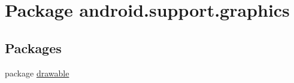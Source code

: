 \hypertarget{namespaceandroid_1_1support_1_1graphics}{}\section{Package android.\+support.\+graphics}
\label{namespaceandroid_1_1support_1_1graphics}
\subsection*{Packages}
\begin{DoxyCompactItemize}
\item 
package \mbox{\hyperlink{namespaceandroid_1_1support_1_1graphics_1_1drawable}{drawable}}
\end{DoxyCompactItemize}
